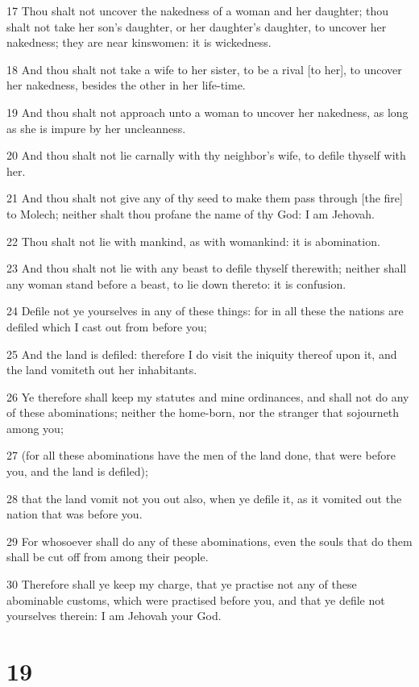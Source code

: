 \par 17 Thou shalt not uncover the nakedness of a woman and her daughter; thou shalt not take her son's daughter, or her daughter's daughter, to uncover her nakedness; they are near kinswomen: it is wickedness.
\par 18 And thou shalt not take a wife to her sister, to be a rival [to her], to uncover her nakedness, besides the other in her life-time.
\par 19 And thou shalt not approach unto a woman to uncover her nakedness, as long as she is impure by her uncleanness.
\par 20 And thou shalt not lie carnally with thy neighbor's wife, to defile thyself with her.
\par 21 And thou shalt not give any of thy seed to make them pass through [the fire] to Molech; neither shalt thou profane the name of thy God: I am Jehovah.
\par 22 Thou shalt not lie with mankind, as with womankind: it is abomination.
\par 23 And thou shalt not lie with any beast to defile thyself therewith; neither shall any woman stand before a beast, to lie down thereto: it is confusion.
\par 24 Defile not ye yourselves in any of these things: for in all these the nations are defiled which I cast out from before you;
\par 25 And the land is defiled: therefore I do visit the iniquity thereof upon it, and the land vomiteth out her inhabitants.
\par 26 Ye therefore shall keep my statutes and mine ordinances, and shall not do any of these abominations; neither the home-born, nor the stranger that sojourneth among you;
\par 27 (for all these abominations have the men of the land done, that were before you, and the land is defiled);
\par 28 that the land vomit not you out also, when ye defile it, as it vomited out the nation that was before you.
\par 29 For whosoever shall do any of these abominations, even the souls that do them shall be cut off from among their people.
\par 30 Therefore shall ye keep my charge, that ye practise not any of these abominable customs, which were practised before you, and that ye defile not yourselves therein: I am Jehovah your God.

\chapter{19}

